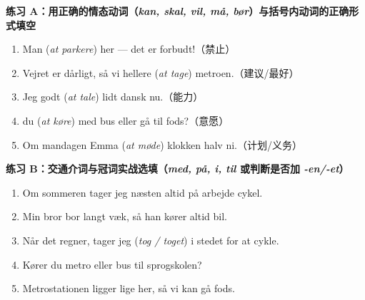 
\textbf{练习 A：用正确的情态动词（\textit{kan, skal, vil, må, bør}）与括号内动词的正确形式填空}
\begin{enumerate}
  \item Man \underline{\hspace{1.4cm}}  \underline{\hspace{2.0cm}} (\textit{at parkere}) her --- det er forbudt!（禁止）
  \item Vejret er dårligt, så vi \underline{\hspace{1.4cm}} hellere \underline{\hspace{2.0cm}} (\textit{at tage}) metroen.（建议/最好）
  \item Jeg \underline{\hspace{1.4cm}} godt \underline{\hspace{2.0cm}} (\textit{at tale}) lidt dansk nu.（能力）
  \item \underline{\hspace{1.4cm}} du \underline{\hspace{2.0cm}} (\textit{at køre}) med bus eller gå til fods?（意愿）
  \item Om mandagen \underline{\hspace{1.4cm}} Emma \underline{\hspace{2.0cm}} (\textit{at møde}) klokken halv ni.（计划/义务）
\end{enumerate}

\textbf{练习 B：交通介词与冠词实战选填（\textit{med, på, i, til} 或判断是否加 \textit{-en/-et}）}
\begin{enumerate}
  \item Om sommeren tager jeg næsten altid på arbejde \underline{\hspace{1.4cm}} cykel.
  \item Min bror bor langt væk, så han kører altid \underline{\hspace{1.4cm}} bil.
  \item Når det regner, tager jeg \underline{\hspace{2.4cm}} (\textit{tog / toget}) i stedet for at cykle.
  \item Kører du \underline{\hspace{1.4cm}} metro eller \underline{\hspace{1.4cm}} bus til sprogskolen?
  \item Metrostationen ligger lige her, så vi kan gå \underline{\hspace{1.4cm}} fods.
\end{enumerate}

